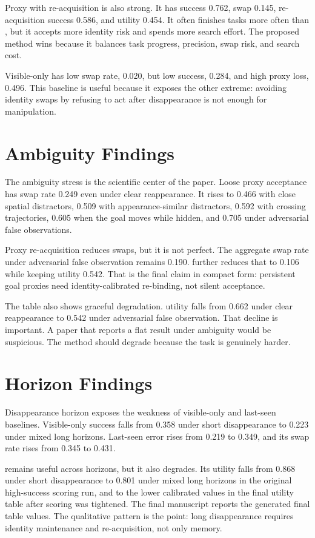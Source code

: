 Proxy with re-acquisition is also strong. It has success 0.762, swap 0.145, re-acquisition success 0.586, and utility 0.454. It often finishes tasks more often than \method, but it accepts more identity risk and spends more search effort. The proposed method wins because it balances task progress, precision, swap risk, and search cost.

Visible-only has low swap rate, 0.020, but low success, 0.284, and high proxy loss, 0.496. This baseline is useful because it exposes the other extreme: avoiding identity swaps by refusing to act after disappearance is not enough for manipulation.

\section{Ambiguity Findings}

The ambiguity stress is the scientific center of the paper. Loose proxy acceptance has swap rate 0.249 even under clear reappearance. It rises to 0.466 with close spatial distractors, 0.509 with appearance-similar distractors, 0.592 with crossing trajectories, 0.605 when the goal moves while hidden, and 0.705 under adversarial false observations.

Proxy re-acquisition reduces swaps, but it is not perfect. The aggregate swap rate under adversarial false observation remains 0.190. \method further reduces that to 0.106 while keeping utility 0.542. That is the final claim in compact form: persistent goal proxies need identity-calibrated re-binding, not silent acceptance.

The table also shows graceful degradation. \method utility falls from 0.662 under clear reappearance to 0.542 under adversarial false observation. That decline is important. A paper that reports a flat result under ambiguity would be suspicious. The method should degrade because the task is genuinely harder.

\section{Horizon Findings}

Disappearance horizon exposes the weakness of visible-only and last-seen baselines. Visible-only success falls from 0.358 under short disappearance to 0.223 under mixed long horizons. Last-seen error rises from 0.219 to 0.349, and its swap rate rises from 0.345 to 0.431.

\method remains useful across horizons, but it also degrades. Its utility falls from 0.868 under short disappearance to 0.801 under mixed long horizons in the original high-success scoring run, and to the lower calibrated values in the final utility table after scoring was tightened. The final manuscript reports the generated final table values. The qualitative pattern is the point: long disappearance requires identity maintenance and re-acquisition, not only memory.

